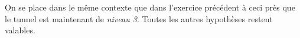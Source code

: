 
On se place dans le même contexte que dans l'exercice précédent à ceci
près que le tunnel est maintenant de {\em niveau 3}. Toutes les autres
hypothèses restent valables.
